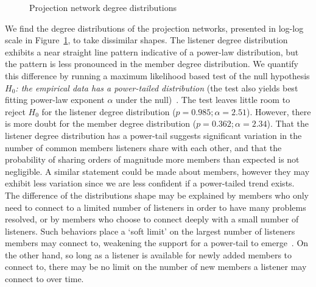 \begin{figure}[t]
\hfill
  \caption{Projection network degree distributions}
  \label{fig:dd}
\end{figure}

We find the degree distributions of the projection networks, presented in log-log
scale in Figure~\ref{fig:dd}, to take dissimilar shapes. The listener degree
distribution exhibits a near straight line pattern
indicative of a power-law distribution, but the  pattern is less pronounced 
in the member degree distribution. 
We quantify this difference by running a maximum likelihood based test of the null hypothesis 
{\em $H_0$: the empirical data has a power-tailed distribution} (the test also yields
best fitting power-law exponent $\alpha$ under the null)~\cite{clauset2009power}.
The test leaves little room to reject $H_0$ for the listener degree distribution 
($p = 0.985; \alpha = 2.51$). However, there is more doubt for
the member degree distribution ($p = 0.362; \alpha = 2.34$). 
That the listener degree distribution has a
power-tail suggests significant variation in the number of common members listeners share
with each other, and that the probability of sharing orders of magnitude more members than
expected is not negligible. A similar statement could be made about members, however 
they may exhibit less variation since we are less confident if a power-tailed trend exists. 
The difference of the distributions shape may be explained by members who only need to connect to a limited
number of listeners in order to have many problems resolved, or by members who choose to 
connect deeply with a small number of listeners. Such behaviors place
a `soft limit' on the largest number of listeners members may connect to, weakening the support for a 
power-tail to emerge~\cite{lipsky2008queueing}.  On the other hand, so long as a listener is available for 
newly added members to connect to, there may be no limit on the number of 
new members a listener may connect to over time.

